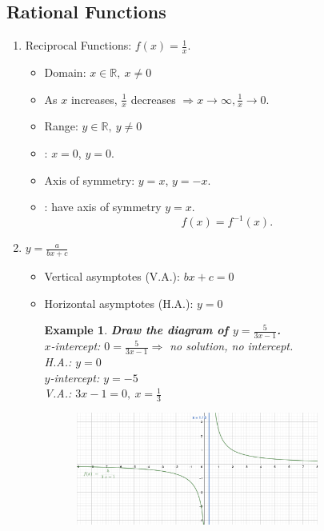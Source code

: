 \documentclass[12pt, a4paper]{article}
\newtheorem{example}{Example}[subsection]
\def\R{{\mathbb{R}}}
\begin{document}
\subsection{Rational Functions}
\begin{enumerate}
    \item Reciprocal Functions: $f(x)=\displaystyle \frac{1}{x}$.
    \begin{itemize}
        \item Domain: $x\in\R,\ x\neq 0$
        \item As $x$ increases, $\displaystyle\frac{1}{x}$ decreases $\Rightarrow x\rightarrow\infty, \displaystyle\frac{1}{x}\rightarrow 0$.
        \item Range: $y\in\R,\ y\neq 0$
        \item \textbf{\color{red}{Asymptotes}}: $x=0$, $y=0$. 
        \item Axis of symmetry: $y=x$, $y=-x$.
        \item \textbf{\color{red}{Self-inversing function}}: have axis of symmetry $y=x$. $$f(x)=f^{-1}(x).$$
    \end{itemize}
    \item $\displaystyle y=\frac{a}{bx+c}$
    \begin{itemize}
        \item Vertical asymptotes (V.A.): $bx+c=0$
        \item Horizontal asymptotes (H.A.): $y=0$
        \begin{example}
            \textbf{Draw the diagram of $\displaystyle y=\frac{5}{3x-1}$.}\\
            $x$-intercept: $0=\frac{5}{3x-1}\Rightarrow$ no solution, no intercept.\\
            H.A.: $y=0$\\
            $y$-intercept: $y=-5$\\
            V.A.: $3x-1=0,\ x=\displaystyle\frac{1}{3}$
            \begin{figure}[H]
                \centering
                \includegraphics[width=0.8\textwidth]{Fig.2.4.jpg}

\end{figure}
\end{example}
\end{itemize}
\end{enumerate}
\end{document}
